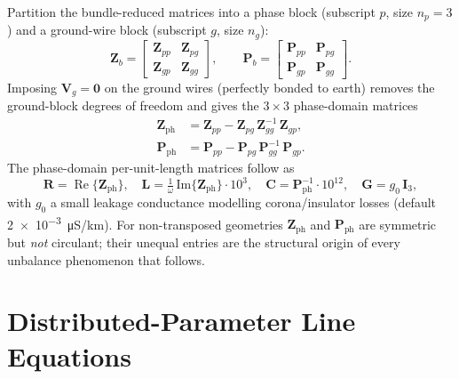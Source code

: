 \documentclass[11pt,a4paper]{article}
\newcommand{\matZ}{\bm{Z}}
\newcommand{\matR}{\bm{R}}
\newcommand{\matL}{\bm{L}}
\newcommand{\matC}{\bm{C}}
\newcommand{\matG}{\bm{G}}
\newcommand{\matP}{\bm{P}}
\newcommand{\matI}{\bm{I}}
\newcommand{\vV}{\bm{V}}
\renewcommand{\Re}{\operatorname{Re}}
\begin{document}
Partition the bundle-reduced matrices into a phase block (subscript \(p\),
size \(n_{p}=3\)) and a ground-wire block (subscript \(g\), size \(n_{g}\)):
\begin{equation}
\matZ_{b}=\begin{bmatrix}\matZ_{pp}&\matZ_{pg}\\[2pt]\matZ_{gp}&\matZ_{gg}\end{bmatrix},\qquad
\matP_{b}=\begin{bmatrix}\matP_{pp}&\matP_{pg}\\[2pt]\matP_{gp}&\matP_{gg}\end{bmatrix}.
\end{equation}
Imposing \(\vV_{g}=\bm{0}\) on the ground wires (perfectly bonded to earth)
removes the ground-block degrees of freedom and gives the \(3\times 3\)
phase-domain matrices
\begin{align}
\matZ_{\mathrm{ph}} &= \matZ_{pp} - \matZ_{pg}\,\matZ_{gg}^{-1}\,\matZ_{gp},
\label{eq:Kron-Z}\\[2pt]
\matP_{\mathrm{ph}} &= \matP_{pp} - \matP_{pg}\,\matP_{gg}^{-1}\,\matP_{gp}.
\label{eq:Kron-P}
\end{align}
The phase-domain per-unit-length matrices follow as
\begin{equation}
\matR = \Re\{\matZ_{\mathrm{ph}}\},\quad
\matL = \tfrac{1}{\omega}\,\mathrm{Im}\{\matZ_{\mathrm{ph}}\}\cdot 10^{3},\quad
\matC = \matP_{\mathrm{ph}}^{-1}\cdot 10^{12},\quad
\matG = g_{0}\,\matI_{3},
\label{eq:RLCG}
\end{equation}
with \(g_{0}\) a small leakage conductance modelling corona/insulator losses
(default \SI{2e-3}{\micro\siemens/\kilo\metre}). For non-transposed geometries
\(\matZ_{\mathrm{ph}}\) and \(\matP_{\mathrm{ph}}\) are symmetric but
\emph{not} circulant; their unequal entries are the structural origin of
every unbalance phenomenon that follows.

\section{Distributed-Parameter Line Equations}
\end{document}
